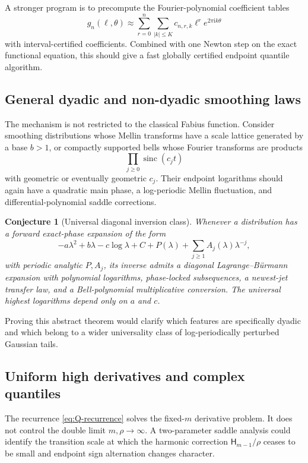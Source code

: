 \documentclass[11pt,oneside]{article}
\numberwithin{equation}{section}
\newtheorem{conjecture}[theorem]{Conjecture}
\theoremstyle{definition}
\theoremstyle{remark}
\newcommand{\ii}{\mathrm i}
\begin{document}
A stronger program is to precompute the Fourier-polynomial coefficient tables
\begin{equation}
 g_n(\ell,\theta)\approx
 \sum_{r=0}^{n}\sum_{|k|\le K}c_{n,r,k}\ell^r e^{2\pi\ii k\theta}
 \label{eq:coefficient-table}
\end{equation}
with interval-certified coefficients.  Combined with one Newton step on the exact functional equation, this should give a fast globally certified endpoint quantile algorithm.

\subsection{General dyadic and non-dyadic smoothing laws}
The mechanism is not restricted to the classical Fabius function.  Consider smoothing distributions whose Mellin transforms have a scale lattice generated by a base $b>1$, or compactly supported bells whose Fourier transforms are products
\begin{equation}
 \prod_{j\ge0}\operatorname{sinc}(c_jt)
 \label{eq:general-sinc-product}
\end{equation}
with geometric or eventually geometric $c_j$.  Their endpoint logarithms should again have a quadratic main phase, a log-periodic Mellin fluctuation, and differential-polynomial saddle corrections.

\begin{conjecture}[Universal diagonal inversion class]
\label{conj:universal-class}
Whenever a distribution has a forward exact-phase expansion of the form
\begin{equation}
 -a\lambda^2+b\lambda-c\log\lambda+C+P(\lambda)
 +\sum_{j\ge1}A_j(\lambda)\lambda^{-j},
 \label{eq:universal-forward-form}
\end{equation}
with periodic analytic $P,A_j$, its inverse admits a diagonal Lagrange--B\"urmann expansion with polynomial logarithms, phase-locked subsequences, a newest-jet transfer law, and a Bell-polynomial multiplicative conversion.  The universal highest logarithms depend only on $a$ and $c$.
\end{conjecture}

Proving this abstract theorem would clarify which features are specifically dyadic and which belong to a wider universality class of log-periodically perturbed Gaussian tails.

\subsection{Uniform high derivatives and complex quantiles}
The recurrence \cref{eq:Q-recurrence} solves the fixed-$m$ derivative problem.  It does not control the double limit $m,\rho\to\infty$.  A two-parameter saddle analysis could identify the transition scale at which the harmonic correction $\mathsf H_{m-1}/\rho$ ceases to be small and endpoint sign alternation changes character.
\end{document}
